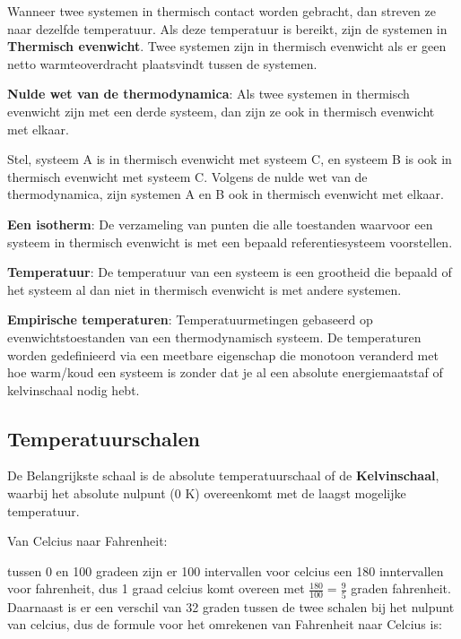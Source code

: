 Wanneer twee systemen in thermisch contact worden gebracht, dan streven ze naar dezelfde temperatuur. Als deze temperatuur is bereikt, zijn de systemen in \textbf{Thermisch evenwicht}. 
Twee systemen zijn in thermisch evenwicht als er geen netto warmteoverdracht plaatsvindt tussen de systemen.

\begin{postulate}
\textbf{Nulde wet van de thermodynamica}: Als twee systemen in thermisch evenwicht zijn met een derde systeem, dan zijn ze ook in thermisch evenwicht met elkaar.
\end{postulate}

Stel, systeem A is in thermisch evenwicht met systeem C, en systeem B is ook in thermisch evenwicht met systeem C. Volgens de nulde wet van de thermodynamica, zijn systemen A en B ook in thermisch evenwicht met elkaar. 

\begin{definition}
    \textbf{Een isotherm}: De verzameling van punten die alle toestanden waarvoor een systeem in thermisch evenwicht is met een bepaald referentiesysteem voorstellen.
\end{definition}

\begin{definition}
    \textbf{Temperatuur}: De temperatuur van een systeem is een grootheid die bepaald of het systeem al dan niet in thermisch evenwicht is met andere systemen.
\end{definition}

\begin{definition}
    \textbf{Empirische temperaturen}: Temperatuurmetingen gebaseerd op evenwichtstoestanden van een thermodynamisch systeem.
    De temperaturen worden gedefinieerd via een meetbare eigenschap die monotoon veranderd met hoe warm/koud een systeem is zonder dat je al een absolute energiemaatstaf of kelvinschaal nodig hebt.
\end{definition}

\subsection{Temperatuurschalen}

De Belangrijkste schaal is de absolute temperatuurschaal of de \textbf{Kelvinschaal}, waarbij het absolute nulpunt (0 K) overeenkomt met de laagst mogelijke temperatuur.

Van Celcius naar Fahrenheit: 

tussen 0 en 100 gradeen zijn er 100 intervallen voor celcius een 180 inntervallen voor fahrenheit, dus 1 graad celcius komt overeen met $\frac{180}{100} = \frac{9}{5}$ graden fahrenheit. Daarnaast is er een verschil van 32 graden tussen de twee schalen bij het nulpunt van celcius, dus de formule voor het omrekenen van Fahrenheit naar Celcius is:

